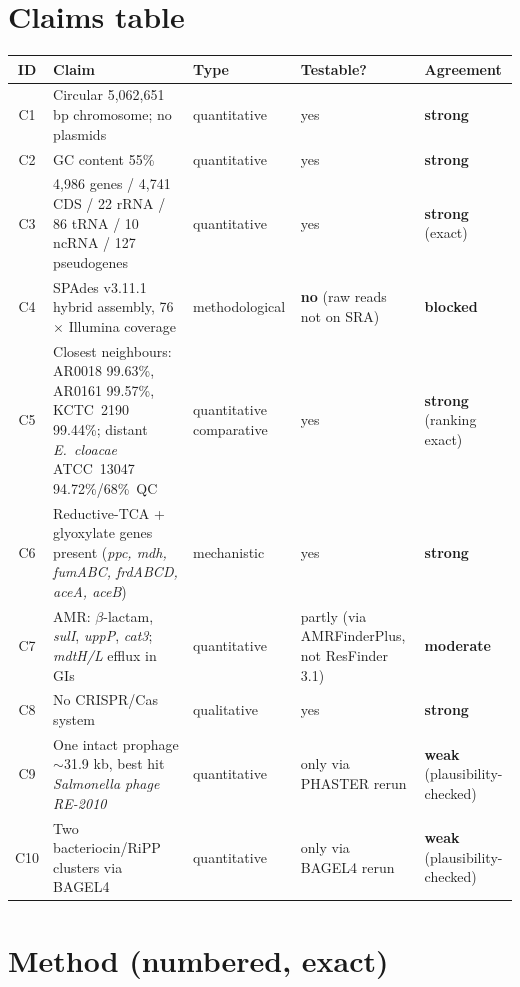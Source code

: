 \documentclass[11pt,letterpaper]{article}
\begin{document}
\section{Claims table}

\begin{longtable}{c p{7.5cm} l l l}
\toprule
ID & Claim & Type & Testable? & Agreement \\
\midrule
\endhead
C1 & Circular 5{,}062{,}651 bp chromosome; no plasmids & quantitative & yes & \textbf{strong} \\
C2 & GC content 55\% & quantitative & yes & \textbf{strong} \\
C3 & 4{,}986 genes / 4{,}741 CDS / 22 rRNA / 86 tRNA / 10 ncRNA / 127 pseudogenes & quantitative & yes & \textbf{strong} (exact) \\
C4 & SPAdes v3.11.1 hybrid assembly, 76$\times$ Illumina coverage & methodological & \textbf{no} (raw reads not on SRA) & \textbf{blocked} \\
C5 & Closest neighbours: AR0018 99.63\%, AR0161 99.57\%, KCTC~2190 99.44\%; distant \emph{E.\ cloacae} ATCC~13047 94.72\%/68\%~QC & quantitative comparative & yes & \textbf{strong} (ranking exact) \\
C6 & Reductive-TCA + glyoxylate genes present (\emph{ppc, mdh, fumABC, frdABCD, aceA, aceB}) & mechanistic & yes & \textbf{strong} \\
C7 & AMR: $\beta$-lactam, \emph{sulI}, \emph{uppP}, \emph{cat3}; \emph{mdtH/L} efflux in GIs & quantitative & partly (via AMRFinderPlus, not ResFinder 3.1) & \textbf{moderate} \\
C8 & No CRISPR/Cas system & qualitative & yes & \textbf{strong} \\
C9 & One intact prophage $\sim$31.9 kb, best hit \emph{Salmonella phage RE-2010} & quantitative & only via PHASTER rerun & \textbf{weak} (plausibility-checked) \\
C10 & Two bacteriocin/RiPP clusters via BAGEL4 & quantitative & only via BAGEL4 rerun & \textbf{weak} (plausibility-checked) \\
\bottomrule
\end{longtable}

\section{Method (numbered, exact)}
\end{document}
